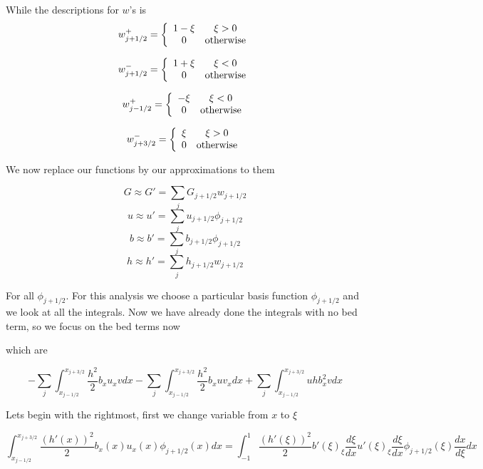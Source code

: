 \documentclass[12pt]{article}
\begin{document}
While the descriptions for $w$'s is
\begin{equation}
w^+_{j+1/2} = \left\lbrace \begin{array}{c c}
1-\xi & \xi > 0 \\
0 & \text{otherwise}
\end{array} 
\right.
\end{equation}

\begin{equation}
w^-_{j+1/2} = \left\lbrace \begin{array}{c c}
1+\xi & \xi < 0 \\
0 & \text{otherwise}
\end{array} 
\right.
\end{equation}

\begin{equation}
w^+_{j-1/2} = \left\lbrace \begin{array}{c c}
-\xi & \xi < 0 \\
0 & \text{otherwise}
\end{array} 
\right.
\end{equation}

\begin{equation}
w^-_{j+3/2} = \left\lbrace \begin{array}{c c}
\xi & \xi > 0 \\
0 & \text{otherwise}
\end{array} 
\right.
\end{equation}

We now replace our functions by our approximations to them

\[G \approx G' = \sum_{j}G_{j+1/2}w_{j+1/2}\]
\[u \approx u' = \sum_{j}u_{j+1/2}\phi_{j+1/2}\]
\[b \approx b' = \sum_{j}b_{j+1/2}\phi_{j+1/2}\]
\[h \approx h' = \sum_{j}h_{j+1/2}w_{j+1/2}\]

For all $\phi_{j+1/2}$. For this analysis we choose a particular basis function $\phi_{j+1/2}$ and we look at all the integrals. Now we have already done the integrals with no bed term, so we focus on the bed terms now

which are

\[
- \sum_{j}\int_{x_{j-1/2}}^{x_{j+3/2}} \frac{h^2}{2}b_x u_x vdx -\sum_{j}\int_{x_{j-1/2}}^{x_{j+3/2}}  \frac{h^2}{2}b_x u v_x dx + \sum_{j}\int_{x_{j-1/2}}^{x_{j+3/2}} u h b_x^2 vdx 
\]

Lets begin with the rightmost, first we change variable from $x$ to $\xi$

\[\int_{x_{j-1/2}}^{x_{j+3/2}} \frac{(h'(x))^2}{2}b_x(x) u_x(x) \phi_{j+1/2}(x)dx = \int_{-1}^{1} \frac{(h'(\xi))^2}{2}b'(\xi)_{\xi}\frac{d\xi}{dx}  u'(\xi)_{\xi} \frac{d\xi}{dx} \phi_{j+1/2}(\xi)  \frac{dx}{d\xi} dx\]
\end{document}
